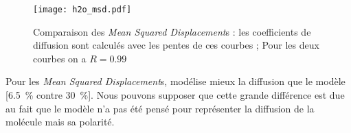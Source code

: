\begin{figure}[h!]
    \centering
    \texttt{[image: h2o\_msd.pdf]}
    \caption{Comparaison des \emph{Mean Squared Displacement}s : les coefficients de diffusion sont calculés avec les pentes de ces courbes ; Pour les deux courbes on a $R = 0.99$}
    \label{fig:h2o_msd}
\end{figure}

Pour les \emph{Mean Squared Displacement}s, \reaxff{} modélise mieux la diffusion que le modèle \spce{} [\qty{6.5}{\percent} contre \qty{30}{\percent}]. Nous pouvons supposer que cette grande différence est due au fait que le modèle \spce{} n'a pas été pensé pour représenter la diffusion de la molécule mais sa polarité.
